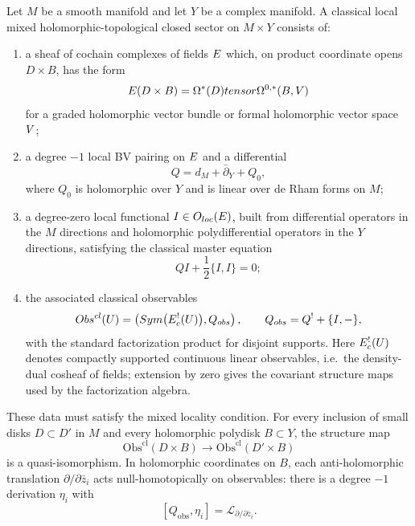 \documentclass[11pt]{memoir}
\begin{document}
\begin{defn}\label{def:local-th-string}
  Let $M$ be a smooth manifold and let $Y$ be a complex manifold. A
  classical local mixed holomorphic-topological closed sector on $M\times Y$
  consists of:
  \begin{enumerate}
    \item a sheaf of cochain complexes of fields $E$ which, on product
      coordinate opens $D\times B$, has the form
      $$E(D\times B)
        =\Omega^*(D)tensor\Omega^{0,*}(B,V)$$
      for a graded holomorphic vector bundle or formal holomorphic vector
      space $V$;
    \item a degree $-1$ local BV pairing on $E$ and a differential
      $$Q=d_M+\bar\partial_Y+Q_0,$$
      where $Q_0$ is holomorphic over $Y$ and is linear over de Rham forms
      on $M$;
    \item a degree-zero local functional
      $I\in O_{loc}(E)$, built from differential
      operators in the $M$ directions and holomorphic polydifferential
      operators in the $Y$ directions, satisfying the classical master
      equation
      $$QI+\frac12\{I,I\}=0;$$
    \item the associated classical observables
      $$Obs^{cl}(U)
        =\left(Sym\bigl(E^!_c(U)\bigr),
        Q_{obs}\right),\qquad
        Q_{obs}=Q^!+\{I,-\},$$
      with the standard factorization product for disjoint supports. Here
      $E^!_c(U)$ denotes compactly supported continuous linear
      observables, i.e.\ the density-dual cosheaf of fields; extension by
      zero gives the covariant structure maps used by the factorization
      algebra.
  \end{enumerate}
  These data must satisfy the mixed locality condition. For every inclusion
  of small disks $D\subset D'$ in $M$ and every holomorphic polydisk
  $B\subset Y$, the structure map
  $$\mathrm{Obs}^{\mathrm{cl}}(D\times B)\longrightarrow
    \mathrm{Obs}^{\mathrm{cl}}(D'\times B)$$
  is a quasi-isomorphism. In holomorphic coordinates on $B$, each
  anti-holomorphic translation $\partial/\partial\bar z_i$ acts
  null-homotopically on observables: there is a degree $-1$ derivation
  $\eta_i$ with
  $$[Q_{\mathrm{obs}},\eta_i]=\mathcal L_{\partial/\partial\bar z_i}.$$


\end{defn}
\end{document}
